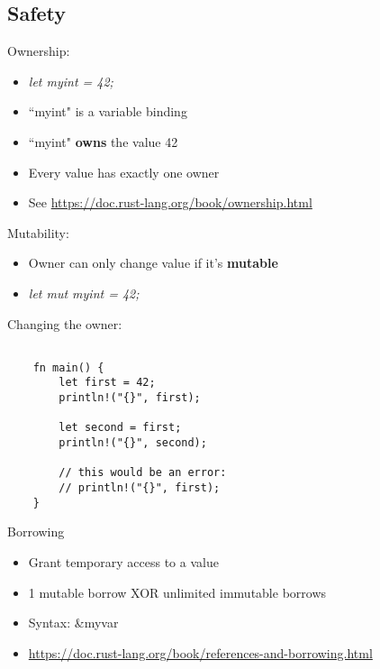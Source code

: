 \documentclass[50pt]{beamer}
\begin{document}
\subsection{Safety}

\begin{frame}
    Ownership:
    \begin{itemize}
        \item \textit{let myint = 42;}
        \item ``myint" is a variable binding
        \item ``myint" \textbf{owns} the value 42
        \item Every value has exactly one owner
        \item See \url{https://doc.rust-lang.org/book/ownership.html}
    \end{itemize}
\end{frame}

\begin{frame}
    Mutability:
    \begin{itemize}
        \item Owner can only change value if it's \textbf{mutable}
        \item \textit{let mut myint = 42;}
    \end{itemize}
\end{frame}

\begin{frame}[fragile]
    Changing the owner:
\begin{verbatim}

    fn main() {
        let first = 42;
        println!("{}", first);

        let second = first;
        println!("{}", second);

        // this would be an error:
        // println!("{}", first);
    }

\end{verbatim}

\end{frame}

\begin{frame}
    Borrowing
    \begin{itemize}
        \item Grant temporary access to a value
        \item 1 mutable borrow XOR unlimited immutable borrows
        \item Syntax: \&myvar
        \item \url{https://doc.rust-lang.org/book/references-and-borrowing.html}
    \end{itemize}
\end{frame}
\end{document}
